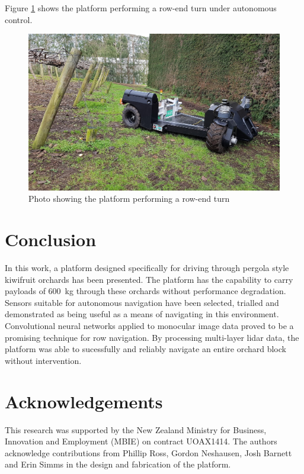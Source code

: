 \documentclass[preprint,authoryear,12pt]{elsarticle}
\begin{document}
    Figure \ref{fig:suzy_turning} shows the platform performing a row-end turn under autonomous control.

    \begin{figure}[htb]
        \centering
        \includegraphics[width=\linewidth]{imgs/photos/suzy_turning.jpg}
        \caption{
            Photo showing the platform performing a row-end turn
        }
        \label{fig:suzy_turning}
    \end{figure}


\section{Conclusion}
    In this work, a platform designed specifically for driving through pergola style kiwifruit orchards has been presented.
    The platform has the capability to carry payloads of \SI{600}{\kilo\gram} through these orchards without performance degradation.
    Sensors suitable for autonomous navigation have been selected, trialled and demonstrated as being useful as a means of navigating in this environment.
    Convolutional neural networks applied to monocular image data proved to be a promising technique for row navigation.
    By processing multi-layer lidar data, the platform was able to sucessfully and reliably navigate an entire orchard block without intervention.


\section*{Acknowledgements}
This research was supported by the New Zealand Ministry for Business, Innovation and Employment (MBIE) on contract UOAX1414.
The authors acknowledge contributions from Phillip Ross, Gordon Neshausen, Josh Barnett and Erin Simms in the design and fabrication of the platform.
\end{document}

